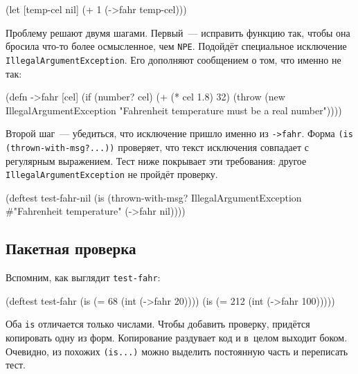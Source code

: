 \begin{english}
  \begin{clojure}
(let [temp-cel nil]
  (+ 1 (->fahr temp-cel)))
  \end{clojure}
\end{english}

\label{illegal-arg}

Проблему решают двумя шагами. Первый~--- исправить функцию так, чтобы она
бросила что-то более осмысленное, чем \verb|NPE|. Подойдёт специальное
исключение \verb|IllegalArgumentException|. Его дополняют сообщением о том,
что именно не так:

\begin{english}
  \begin{clojure}
(defn ->fahr [cel]
  (if (number? cel)
    (+ (* cel 1.8) 32)
    (throw (new IllegalArgumentException
            "Fahrenheit temperature must be a real number"))))
  \end{clojure}
\end{english}

Второй шаг~--- убедиться, что исключение пришло именно из \verb|->fahr|. Форма
\verb|(is (thrown-with-msg?...))| проверяет, что текст исключения совпадает с
регулярным выражением. Тест ниже покрывает эти требования: другое
\verb|IllegalArgumentException| не пройдёт проверку.

\begin{english}
  \begin{clojure}
(deftest test-fahr-nil
  (is (thrown-with-msg?
       IllegalArgumentException #"Fahrenheit temperature"
       (->fahr nil))))
  \end{clojure}
\end{english}

\subsection{Пакетная проверка}

Вспомним, как выглядит \verb|test-fahr|:

\begin{english}
  \begin{clojure}
(deftest test-fahr
  (is (= 68 (int (->fahr 20))))
  (is (= 212 (int (->fahr 100)))))
  \end{clojure}
\end{english}

Оба \verb|is| отличается только числами. Чтобы добавить проверку, придётся
копировать одну из форм. Копирование раздувает код и в~целом выходит
боком. Очевидно, из похожих \verb|(is...)| можно выделить постоянную часть и
переписать тест.

